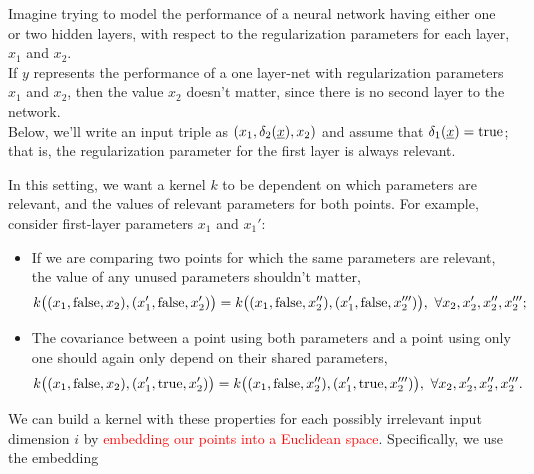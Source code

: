 \documentclass[landscape,a0b,final,a4resizeable]{include/a0poster}
\newcommand{\vect}[1]{\underline{\smash{#1}}}
\renewcommand{\v}[1]{\vect{#1}}
\newcommand{\reals}{\mathds{R}}
\newcommand{\sX}{\mathcal{X}}
\newcommand{\br}{}%
\begin{document}
\begin{poster}
\begin{multicols}{3}
Imagine trying to model the performance of a neural network having either one or two hidden layers, with respect to the regularization parameters for each layer, $x_1$ and $x_2$.\\ 
If $y$ represents the performance of a one layer-net with regularization parameters $x_1$ and $x_2$, then the value $x_2$ doesn't matter, since there is no second layer to the network.\\
Below, we'll write an input triple as $(x_1, \delta_2(\v{x}), x_2)$ and assume that $\delta_1(\v{x}) = \text{true}$; that is, the regularization parameter for the first layer is always relevant. 

In this setting, we want a kernel $k$ to be dependent on which parameters are relevant, and the values of relevant parameters for both points. For example, consider first-layer parameters $x_1$ and $x_1'$:
%
\begin{itemize}
\item If we are comparing two points for which the same parameters are relevant, the value of any unused parameters shouldn't matter,  
\begin{equation*}
 k\bigl((x_1, \textnormal{false}, x_2), (x_1', \textnormal{false}, x_2') \bigr)
= k\bigl((x_1, \textnormal{false}, x_2''), (x_1', \textnormal{false}, x_2''')\bigr),\ 
\forall x_2, x_2', x_2'', x_2''';
\end{equation*}
\item The covariance between a point using both parameters and a point using only one should again only depend on their shared parameters,
\begin{equation*}
 k\bigl((x_1, \textnormal{false}, x_2), (x_1', \textnormal{true}, x_2') \bigr)
= k\bigl((x_1, \textnormal{false}, x_2''), (x_1', \textnormal{true}, x_2''')\bigr),\ 
\forall x_2, x_2', x_2'', x_2'''.
\end{equation*}
\end{itemize}




\newpage 
{}

We can build a kernel with these properties for each possibly irrelevant input dimension $i$ by {\textcolor{red}{embedding our points into a Euclidean space}}.  Specifically, we use the embedding
%
%
%


\end{multicols}
\end{poster}
\end{document}
